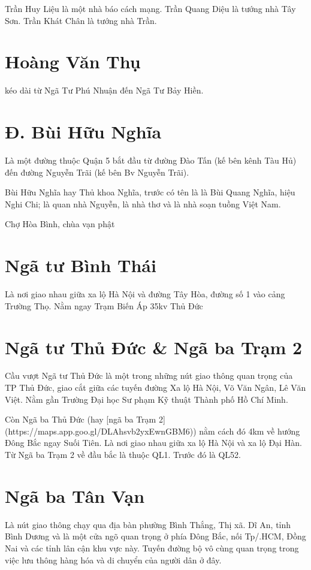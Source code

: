 Trần Huy Liệu là một nhà báo cách mạng. Trần Quang Diệu là tướng nhà Tây Sơn. Trần Khát Chân là tướng nhà Trần.

\section{Hoàng Văn Thụ}

kéo dài từ Ngã Tư Phú Nhuận đến Ngã Tư Bảy Hiền.

\section{Đ. Bùi Hữu Nghĩa}

Là một đường thuộc Quận 5 bắt đầu từ đường Đào Tấn (kế bên kênh Tàu Hủ) đến đường Nguyễn Trãi (kế bên Bv Nguyễn Trãi).

Bùi Hữu Nghĩa hay Thủ khoa Nghĩa, trước có tên là là Bùi Quang Nghĩa, hiệu Nghi Chi; là quan nhà Nguyễn, là nhà thơ và là nhà soạn tuồng Việt Nam.

Chợ Hòa Bình, chùa vạn phật

\section{Ngã tư Bình Thái}

Là nơi giao nhau giữa xa lộ Hà Nội và đường Tây Hòa, đường số 1 vào cảng Trường Thọ. Nằm ngay Trạm Biến Áp 35kv Thủ Đức

\section{Ngã tư Thủ Đức \& Ngã ba Trạm 2}

Cầu vượt Ngã tư Thủ Đức là một trong những nút giao thông quan trọng của TP Thủ Đức, giao cắt giữa các tuyến đường Xa lộ Hà Nội, Võ Văn Ngân, Lê Văn Việt. Nằm gần Trường Đại học Sư phạm Kỹ thuật Thành phố Hồ Chí Minh.

Còn Ngã ba Thủ Đức (hay [ngã ba Trạm 2](https://maps.app.goo.gl/DLAhsvb2yxEwnGBM6)) nằm cách đó 4km về hướng Đông Bắc ngay Suối Tiên. Là nơi giao nhau giữa xa lộ Hà Nội và xa lộ Đại Hàn. Từ Ngã ba Trạm 2 về đầu bắc là thuộc QL1. Trước đó là QL52.

\section{Ngã ba Tân Vạn}

Là nút giao thông chạy qua địa bàn phường Bình Thắng, Thị xã. Dĩ An, tỉnh Bình Dương và là một cửa ngõ quan trọng ở phía Đông Bắc, nối Tp/.HCM, Đồng Nai và các tỉnh lân cận khu vực này. Tuyến đường bộ vô cùng quan trọng trong việc lưu thông hàng hóa và di chuyển của người dân ở đây.

